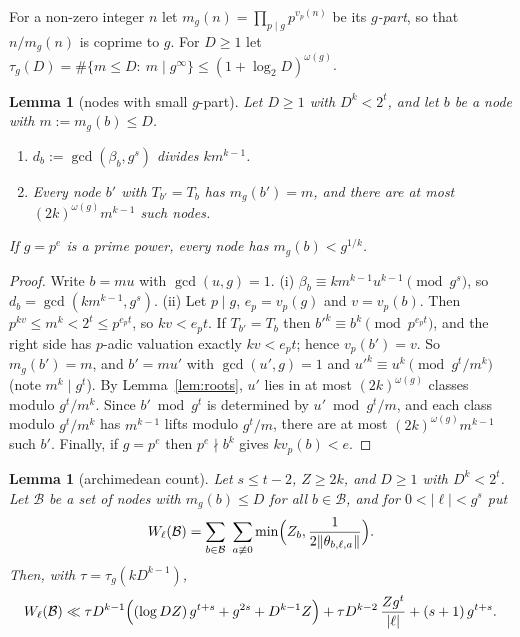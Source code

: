 \documentclass[11pt]{amsart}
\newtheorem{lemma}[theorem]{Lemma}
\theoremstyle{definition}
\numberwithin{equation}{section}
\newcommand{\cB}{\mathcal{B}}
\begin{document}
For a non-zero integer $n$ let $m_g(n)=\prod_{p\mid g}p^{v_p(n)}$ be its
\emph{$g$-part}, so that $n/m_g(n)$ is coprime to $g$. For $D\ge1$ let
$\tau_g(D)=\#\{m\le D:\ m\mid g^\infty\}\le(1+\log_2D)^{\omega(g)}$.

\begin{lemma}[nodes with small $g$-part]\label{lem:nodes}
Let $D\ge1$ with $D^k<2^t$, and let $b$ be a node with $m:=m_g(b)\le D$.
\begin{enumerate}[label=\textup{(\roman*)}]
\item $d_b:=\gcd(\beta_b,g^s)$ divides $km^{k-1}$.
\item Every node $b'$ with $T_{b'}=T_b$ has $m_g(b')=m$, and there are at
most $(2k)^{\omega(g)}m^{k-1}$ such nodes.
\end{enumerate}
If $g=p^e$ is a prime power, every node has $m_g(b)<g^{1/k}$.
\end{lemma}

\begin{proof}
Write $b=mu$ with $\gcd(u,g)=1$. (i) $\beta_b\equiv km^{k-1}u^{k-1}\pmod{g^s}$,
so $d_b=\gcd(km^{k-1},g^s)$. (ii) Let $p\mid g$, $e_p=v_p(g)$ and $v=v_p(b)$.
Then $p^{kv}\le m^k<2^t\le p^{e_pt}$, so $kv<e_pt$. If $T_{b'}=T_b$ then
$b'^k\equiv b^k\pmod{p^{e_pt}}$, and the right side has $p$-adic valuation
exactly $kv<e_pt$; hence $v_p(b')=v$. So $m_g(b')=m$, and $b'=mu'$ with
$\gcd(u',g)=1$ and $u'^k\equiv u^k\pmod{g^t/m^k}$ (note $m^k\mid g^t$). By
Lemma~\ref{lem:roots}, $u'$ lies in at most $(2k)^{\omega(g)}$ classes
modulo $g^t/m^k$. Since $b'\bmod g^t$ is determined by $u'\bmod g^t/m$, and
each class modulo $g^t/m^k$ has $m^{k-1}$ lifts modulo $g^t/m$, there are at
most $(2k)^{\omega(g)}m^{k-1}$ such $b'$. Finally, if $g=p^e$ then
$p^e\nmid b^k$ gives $kv_p(b)<e$.
\end{proof}

\begin{lemma}[archimedean count]\label{lem:count}
Let $s\le t-2$, $Z\ge2k$, and $D\ge1$ with $D^k<2^t$. Let $\cB$ be a set of
nodes with $m_g(b)\le D$ for all $b\in\cB$, and for $0<|\ell|<g^s$ put
\[
W_\ell(\cB)=\sum_{b\in\cB}\ \sum_{a\not\equiv0}\min\Bigl(Z_b,\frac1{2\|\theta_{b,\ell,a}\|}\Bigr).
\]
Then, with $\tau=\tau_g(kD^{k-1})$,
\[
W_\ell(\cB)\ll\tau D^{k-1}\Bigl((\log DZ)\,g^{t+s}+g^{2s}+D^{k-1}Z\Bigr)+\tau D^{k-2}\,\frac{Zg^t}{|\ell|}+(s+1)\,g^{t+s}.
\]
\end{lemma}
\end{document}
